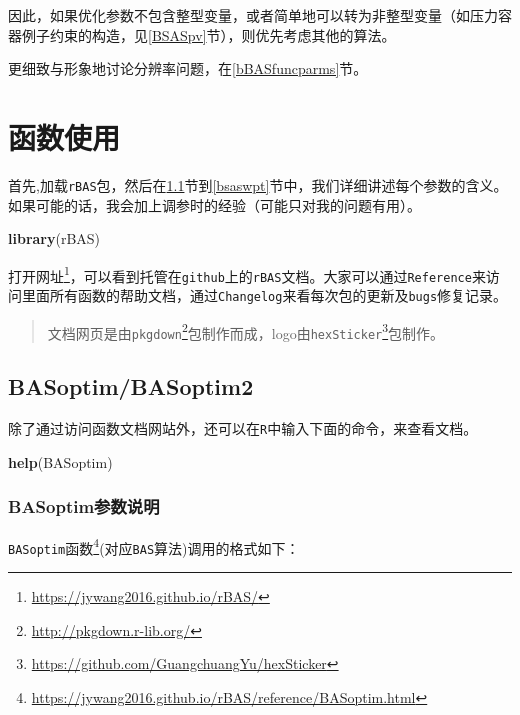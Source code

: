 \documentclass[]{ctexbook}
\newenvironment{Shaded}{\begin{snugshade}}{\end{snugshade}}
\newcommand{\KeywordTok}[1]{\textcolor[rgb]{0.13,0.29,0.53}{\textbf{#1}}}
\newcommand{\NormalTok}[1]{#1}
\renewcommand{\href}[2]{#2\footnote{\url{#1}}}
\begin{document}
因此，如果优化参数不包含整型变量，或者简单地可以转为非整型变量（如压力容器例子约束的构造，见\ref{BSASpv}节），则优先考虑其他的算法。

更细致与形象地讨论分辨率问题，在\ref{bBASfuncparms}节。

\chapter{函数使用}\label{rBAS}

首先,加载\texttt{rBAS}包，然后在\ref{basoptim}节到\ref{bsaswpt}节中，我们详细讲述每个参数的含义。如果可能的话，我会加上调参时的经验（可能只对我的问题有用）。

\begin{Shaded}
\begin{Highlighting}[]
\KeywordTok{library}\NormalTok{(rBAS)}
\end{Highlighting}
\end{Shaded}

打开\href{https://jywang2016.github.io/rBAS/}{网址}，可以看到托管在\texttt{github}上的\texttt{rBAS}文档。大家可以通过\texttt{Reference}来访问里面所有函数的帮助文档，通过\texttt{Changelog}来看每次包的更新及\texttt{bugs}修复记录。

\begin{quote}
文档网页是由\href{http://pkgdown.r-lib.org/}{\texttt{pkgdown}}包制作而成，logo由\href{https://github.com/GuangchuangYu/hexSticker}{\texttt{hexSticker}}包制作。
\end{quote}

\section{BASoptim/BASoptim2}\label{basoptim}

除了通过访问函数文档网站外，还可以在\texttt{R}中输入下面的命令，来查看文档。

\begin{Shaded}
\begin{Highlighting}[]
\KeywordTok{help}\NormalTok{(BASoptim)}
\end{Highlighting}
\end{Shaded}

\subsection{BASoptim参数说明}\label{BASparms}

\href{https://jywang2016.github.io/rBAS/reference/BASoptim.html}{\texttt{BASoptim}函数}(对应\texttt{BAS}算法)调用的格式如下：
\end{document}
